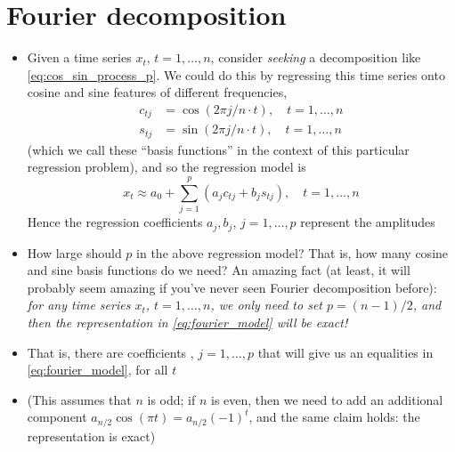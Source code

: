 \documentclass{article}
\begin{document}
\section{Fourier decomposition}

\begin{itemize}
\item Given a time series $x_t$, $t = 1,\dots,n$, consider \emph{seeking} a
  decomposition like \eqref{eq:cos_sin_process_p}. We could do this by
  regressing this time series onto cosine and sine features of different
  frequencies,  
  \begin{align*}
  c_{tj} &= \cos(2\pi j/n \cdot t), \quad t = 1,\dots,n \\
  s_{tj} &= \sin(2\pi j/n \cdot t), \quad t = 1,\dots,n
  \end{align*}
  (which we call these ``basis functions'' in the context of this particular
  regression problem), and so the regression model is 
  \begin{equation}
  \label{eq:fourier_model}
  x_t \approx a_0 + \sum_{j=1}^p (a_j c_{tj} + b_j s_{tj}), \quad t = 1,\dots,n 
  \end{equation}
  Hence the regression coefficients $a_j,b_j$, $j = 1,\dots,p$ represent the 
  amplitudes 

\item How large should $p$ in the above regression model? That is, how many
  cosine and sine basis functions do we need? An amazing fact (at least, it will
  probably seem amazing if you've never seen Fourier decomposition before): 
  \emph{for any time series $x_t$, $t = 1,\dots,n$, we only need to set $p =
    (n-1)/2$, and then the representation in \eqref{eq:fourier_model} will be 
    exact!}  

\item That is, there are coefficients , $j =
  1,\dots,p$ that will give us an equalities in \eqref{eq:fourier_model}, for
  all $t$  

\item (This assumes that $n$ is odd; if $n$ is even, then we need to add an
  additional component $a_{n/2} \cos(\pi t) = a_{n/2} (-1)^t$, and the same
  claim holds: the representation is exact)  


\end{itemize}
\end{document}
